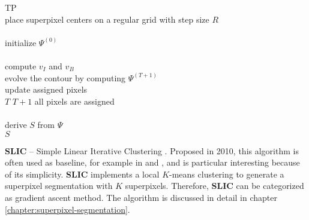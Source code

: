 \begin{algorithm}[t]
	\begin{algo}{TP}{\label{algo:related-work-turbopixels}}
		\\
		place superpixel centers on a regular grid with step size $R$\\
		\\
		initialize $\Psi^{(0)}$\\
		\qrepeat\\
			compute $v_I$ and $v_B$\\
			evolve the contour by computing $\Psi^{(T+1)}$\\
			update assigned pixels\\
			$T$ \qlet $T + 1$
		\quntil all pixels are assigned\\
		\\
		derive $S$ from $\Psi$\\
		\qreturn $S$
	\end{algo}
	\caption{The superpixel algorithm \textbf{TP} proposed in \cite{LevinshteinStereKutulakosFleetDickinsonSiddiqi:2009}.}
	\label{fig:related-work-tp-algorithm}
\end{algorithm}

\textbf{SLIC} -- Simple Linear Iterative Clustering \cite{AchantaShajiSmithLucchiFuaSuesstrunk:2010}. Proposed in 2010, this algorithm is often used as baseline, for example in \cite{HuazhuFuXiaochunCaoDaiTangYahongHanDongXu:2014, PaponAbramovSchoelerWoergoetter:2013, VanDenBerghBoixRoigCapitaniVanGool:2012} and \cite{ConradMertzMester:2013}, and is particular interesting because of its simplicity. \textbf{SLIC} implements a local $K$-means clustering to generate a superpixel segmentation with $K$ superpixels. Therefore, \textbf{SLIC} can be categorized as gradient ascent method. The algorithm is discussed in detail in chapter \ref{chapter:superpixel-segmentation}.

